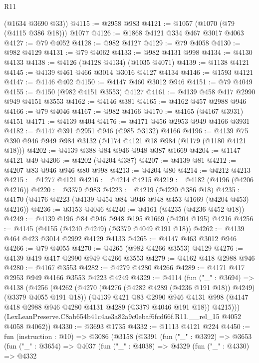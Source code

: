 \begin{lexlean}{R11}
\begin{coremodule}
      (@1634 @3690 @33))
@4115 := @2958 @983
@4121 := @1057 (@1070 (@79 (@4115 @386 @18))) @1077
@4126 := @1868 @4121 @334 @467 @3017 @4063
@4127 := @79 @4052
@4128 := @982 @4127
@4129 := @79 @4058
@4130 := @982 @4129
@4131 := @79 @4062
@4133 := @982 @4131 @998
@4134 := @4130 @4133
@4138 := @4126 (@4128 @4134) (@1035 @4071)
@4139 := @1138 @4121
@4145 := @4139 @461 @466 @3014 @3016 @4127 @4134
@4146 := @1593 @4121
@4147 := @4146 @402
@4150 := @4147 @460 @3012 @946
@4151 := @79 @4049
@4155 := @4150 (@982 @4151 @3553) @4127
@4161 := @4139 @458 @417 @2990 @949 @4151 @3553
@4162 := @4146 @381
@4165 := @4162 @457 @2988 @946
@4166 := @79 @4046
@4167 := @982 @4166
@4170 := @4165 (@4167 @3931) @4151
@4171 := @4139 @404
@4176 := @4171 @456 @2953 @949 @4166 @3931
@4182 := @4147 @391 @2951 @946 (@985 @3132) @4166
@4196 := @4139 @75 @390 @946 @949 @984 @3132 (@1174 @4121 @18 @984 (@1179 (@1180 @4121 @18)))
@4202 := @4139 @388 @84 @946 @948 @387 @1669
@4204 := @1147 @4121 @49
@4206 := @4202 (@4204 @387)
@4207 := @4139 @81
@4212 := @4207 @83 @946 @946 @80 @998
@4213 := @4204 @80
@4214 := @4212 @4213
@4215 := @1277 @4121
@4216 := @4214 @4215
@4219 := @4182 (@4196 (@4206 @4216))
@4220 := @3379 @983
@4223 := @4219 (@4220 @386 @18)
@4235 := @4170 (@4176 @4223 (@4139 @454 @84 @946 @948 @453 @1669 (@4204 @453) @4216))
@4236 := @3153 @4046
@4240 := @4161 (@4235 (@4236 @452 @18))
@4249 := @4139 @196 @84 @946 @948 @195 @1669 (@4204 @195) @4216
@4256 := @4145 (@4155 (@4240 @4249) (@3379 @4049 @191 @18))
@4262 := @4139 @464 @423 @3014 @2992 @4129 @4133
@4265 := @4147 @463 @3012 @946
@4266 := @79 @4055
@4270 := @4265 (@982 @4266 @3553) @4129
@4276 := @4139 @419 @417 @2990 @949 @4266 @3553
@4279 := @4162 @418 @2988 @946
@4280 := @4167 @3553
@4282 := @4279 @4280 @4266
@4289 := @4171 @417 @2953 @949 @4166 @3553 @4223 @4249
@4329 := @4114
    (fun ("_" : @3694) =>
    @4138
      (@4256
        (@4262
          (@4270 (@4276 (@4282 @4289 (@4236 @191 @18)) @4249) (@3379 @4055 @191 @18))
          (@4139
            @421
            @83
            @2990
            @946
            @4131
            @998
            (@4147 @418 @2988 @946 @4280 @4131 @4289 (@3379 @4046 @191 @18))
            @4215)))
      (LexLeanPreserve.C8ab654b41c4ae3a82a9c0ebaf6fcd66f.R11.__rel_15 @4052 @4058 @4062))
@4330 := @3693 @1735
@4332 := @1113 @4121 @224
@4450 := fun (instruction : @10) =>
  @3086
    (@3158
      (@3391
        (fun ("_" : @3392) =>
        @3653
          (fun ("_" : @3654) =>
          @4037
            (fun ("_" : @4038) =>
            @4329
              (fun ("_" : @4330) =>
              @4332

\end{coremodule}
\end{lexlean}
